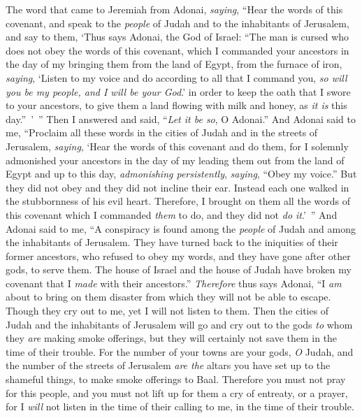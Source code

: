 \begin{biblechapter} %
 The word that came to Jeremiah from Adonai, \textit{saying},
\verse “Hear the words of this covenant, and speak to the \textit{people} of Judah and to the inhabitants of Jerusalem,
\verse and say to them, ‘Thus says Adonai, the God of Israel: “The man is cursed who does not obey the words of this covenant,
\verse which I commanded your ancestors in the day of my bringing them from the land of Egypt, from the furnace of iron, \textit{saying}, ‘Listen to my voice and do according to all that I command you, \textit{so will you be my people, and I will be your God}.’
\verse in order to keep the oath that I swore to your ancestors, to give them a land flowing with milk and honey, as \textit{it is} this day.” ’ ” Then I answered and said, “\textit{Let it be so}, O Adonai.”
\verse And Adonai said to me, “Proclaim all these words in the cities of Judah and in the streets of Jerusalem, \textit{saying}, ‘Hear the words of this covenant and do them,
\verse for I solemnly admonished your ancestors in the day of my leading them out from the land of Egypt and up to this day, \textit{admonishing persistently}, \textit{saying}, “Obey my voice.”
\verse But they did not obey and they did not incline their ear. Instead each one walked in the stubbornness of his evil heart. Therefore, I brought on them all the words of this covenant which I commanded \textit{them} to do, and they did not \textit{do it}.’ ”
\verse And Adonai said to me, “A conspiracy is found among the \textit{people} of Judah and among the inhabitants of Jerusalem.
\verse They have turned back to the iniquities of their former ancestors, who refused to obey my words, and they have gone after other gods, to serve them. The house of Israel and the house of Judah have broken my covenant that I \textit{made} with their ancestors.”
\verse \textit{Therefore} thus says Adonai, “I \textit{am} about to bring on them disaster from which they will not be able to escape. Though they cry out to me, yet I will not listen to them.
\verse Then the cities of Judah and the inhabitants of Jerusalem will go and cry out to the gods \textit{to} whom they \textit{are} making smoke offerings, but they will certainly not save them in the time of their trouble.
\verse For the number of your towns are your gods, \textit{O} Judah, and the number of the streets of Jerusalem \textit{are the} altars you have set up to the shameful things, to make smoke offerings to Baal.
\verse Therefore you must not pray for this people, and you must not lift up for them a cry of entreaty, or a prayer, for I \textit{will} not listen in the time of their calling to me, in the time of their trouble.

\end{biblechapter}
